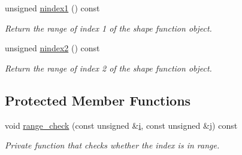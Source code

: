 \begin{DoxyCompactItemize}
unsigned \hyperlink{classoomph_1_1Shape_a374bd15fa30336247543459231f82af0}{nindex1} () const
\begin{DoxyCompactList}\small\item\em Return the range of index 1 of the shape function object. \end{DoxyCompactList}\item 
unsigned \hyperlink{classoomph_1_1Shape_ae5be285b7233935366b561646a085463}{nindex2} () const
\begin{DoxyCompactList}\small\item\em Return the range of index 2 of the shape function object. \end{DoxyCompactList}\end{DoxyCompactItemize}
\subsection*{Protected Member Functions}
\begin{DoxyCompactItemize}
\item 
void \hyperlink{classoomph_1_1Shape_af24aed6aba597ff8cd52d201be5a414a}{range\+\_\+check} (const unsigned \&\hyperlink{cfortran_8h_adb50e893b86b3e55e751a42eab3cba82}{i}, const unsigned \&j) const
\begin{DoxyCompactList}\small\item\em Private function that checks whether the index is in range. \end{DoxyCompactList}\end{DoxyCompactItemize}
